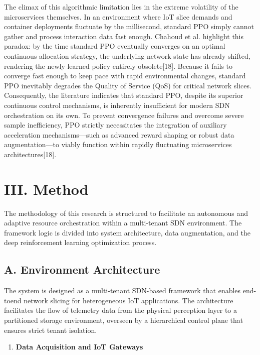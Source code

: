 The climax of this algorithmic limitation lies in the extreme volatility of the microservices themselves. In an environment where IoT slice demands and container deployments fluctuate by the millisecond, standard PPO simply cannot gather and process interaction data fast enough. Chahoud et al. highlight this paradox: by the time standard PPO eventually converges on an optimal continuous allocation strategy, the underlying network state has already shifted, rendering the newly learned policy entirely obsolete{[}18{]}. Because it fails to converge fast enough to keep pace with rapid environmental changes, standard PPO inevitably degrades the Quality of Service (QoS) for critical network slices. Consequently, the literature indicates that standard PPO, despite its superior continuous control mechanisms, is inherently insufficient for modern SDN orchestration on its own. To prevent convergence failures and overcome severe sample inefficiency, PPO strictly necessitates the integration of auxiliary acceleration mechanisms---such as advanced reward shaping or robust data augmentation---to viably function within rapidly fluctuating microservices architectures{[}18{]}.

\section{III. Method}\label{iii.-method}

The methodology of this research is structured to facilitate an autonomous and adaptive resource orchestration within a multi-tenant SDN environment. The framework logic is divided into system architecture, data augmentation, and the deep reinforcement learning optimization process.

\subsection{A. Environment Architecture}\label{a.-environment-architecture}

The system is designed as a multi-tenant SDN-based framework that enables end-toend network slicing for heterogeneous IoT applications. The architecture facilitates the flow of telemetry data from the physical perception layer to a partitioned storage environment, overseen by a hierarchical control plane that ensures strict tenant isolation.

\begin{enumerate}
\def\labelenumi{\arabic{enumi})}
\item
  \textbf{Data Acquisition and IoT Gateways}
\end{enumerate}

